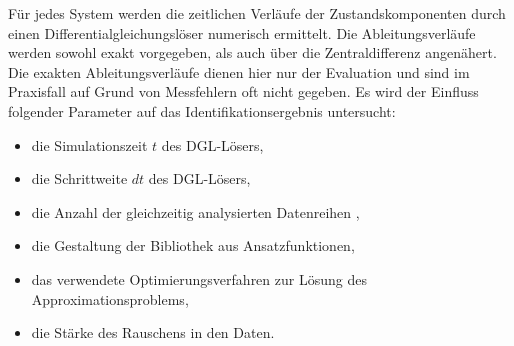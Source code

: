 Für jedes System werden die zeitlichen Verläufe der Zustandskomponenten durch einen Differentialgleichungslöser numerisch ermittelt. Die Ableitungsverläufe werden sowohl exakt vorgegeben, als auch über die Zentraldifferenz angenähert. Die exakten Ableitungsverläufe dienen hier nur der Evaluation und sind im Praxisfall auf Grund von Messfehlern oft nicht gegeben. Es wird der Einfluss folgender Parameter auf das Identifikationsergebnis untersucht:
\begin{itemize}
\item die Simulationszeit $t$ des DGL-Lösers,
\item die Schrittweite $dt$ des DGL-Lösers,
\item die Anzahl der gleichzeitig analysierten Datenreihen ,
\item die Gestaltung der Bibliothek aus Ansatzfunktionen,
\item das verwendete Optimierungsverfahren zur Lösung des Approximationsproblems,
\item die Stärke des Rauschens in den Daten.
\end{itemize}




